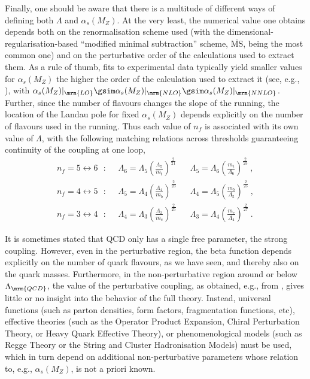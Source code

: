 %
%
%
Finally, one should be aware that there is a multitude of different
ways of defining both $\Lambda$ and $\alpha_s(M_Z)$. At the very
least, the numerical value one obtains depends both on the
renormalisation scheme used (with the dimensional-regularisation-based
``modified minimal subtraction'' scheme, $\overline{\mbox{MS}}$, being the
most common one) and on the perturbative order of the calculations 
used to extract them. As a rule of thumb, fits to experimental data typically yield 
smaller values for $\alpha_s(M_Z)$ the higher the order of the
calculation used to extract it (see, e.g.,
\cite{Bethke:2009jm,Dissertori:2009ik,Bethke:2012jm,pdg2012}), with  $
\alpha_s(M_Z)\vert_{\mrm{LO}} \gsim \alpha_s(M_Z)\vert_{\mrm{NLO}}
\gsim \alpha_s(M_Z)\vert_{\mrm{NNLO}}$. 
Further, since the number of flavours changes the slope
of the running, the location of the Landau pole for fixed
$\alpha_s(M_Z)$ depends explicitly on the number of flavours used in
the running. Thus each value of $n_f$ is associated with its own
value of $\Lambda$, with the following matching relations across
thresholds guaranteeing continuity of the coupling at one loop,
%
\begin{eqnarray}
n_f = 5 \leftrightarrow 6 ~~~:~~~~~~\Lambda_6 = \Lambda_5
  \left(\frac{\Lambda_5}{m_t}\right)^{\frac{2}{21}} & & 
\Lambda_5 = \Lambda_6
  \left(\frac{m_t}{\Lambda_6}\right)^{\frac{2}{23}} ~, \\[2mm]
n_f = 4 \leftrightarrow 5 ~~~:~~~~~~\Lambda_5 = \Lambda_4
  \left(\frac{\Lambda_4}{m_b}\right)^{\frac{2}{23}} & & 
\Lambda_4 = \Lambda_5
  \left(\frac{m_b}{\Lambda_5}\right)^{\frac{2}{25}} ~, \\[2mm]
n_f = 3 \leftrightarrow 4 ~~~:~~~~~~\Lambda_4 = \Lambda_3 
  \left(\frac{\Lambda_3}{m_c}\right)^{\frac{2}{25}} & &
\Lambda_3 = \Lambda_4 
  \left(\frac{m_c}{\Lambda_4}\right)^{\frac{2}{27}} ~.
\end{eqnarray}

%
%
It is sometimes stated that QCD only has a single free
parameter, the  strong coupling. 
However, even in the perturbative
region, the beta function depends explicitly on the number of
quark flavours, as we have seen, and thereby also on the quark
masses. Furthermore, in the non-perturbative region around or below
$\Lambda_{\mrm{QCD}}$, the value of the 
perturbative coupling, as obtained, e.g., from ,
gives little or no insight into the behavior of the full theory. 
Instead, universal functions (such as parton densities, form factors,
fragmentation functions, etc), effective theories (such as the
Operator Product Expansion, Chiral Perturbation Theory, or Heavy Quark
Effective Theory), or phenomenological models (such as Regge Theory or
the String and Cluster Hadronisation Models) must be used, which in
turn depend on additional non-perturbative parameters whose relation to, e.g.,
$\alpha_s(M_Z)$, is not a priori known. 

